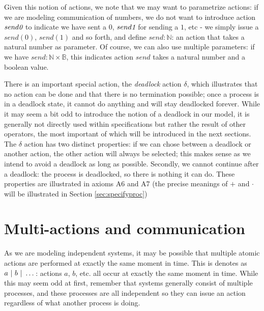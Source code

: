 Given this notion of actions, we note that we may want to parametrize actions: if we are modeling communication of numbers, we do not want to introduce action $send\emph{0}$ to indicate we have sent a $0$, $send\emph{1}$ for sending a $1$, etc - we simply issue a $send(0)$, $send(1)$ and so forth, and define $send : \mathds{N}$: an action that takes a natural number as parameter. Of course, we can also use multiple parameters: if we have $send : \mathds{N} \times \mathds{B}$, this indicates action $send$ takes a natural number and a boolean value.

There is an important special action, the \emph{deadlock} action $\delta$, which illustrates that no action can be done and that there is no termination possible; once a process is in a deadlock state, it cannot do anything and will stay deadlocked forever. While it may seem a bit odd to introduce the notion of a deadlock in our model, it is generally not directly used within specifications but rather the result of other operators, the most important of which will be introduced in the next sections. The $\delta$ action has two distinct properties: if we can chose between a deadlock or another action, the other action will always be selected; this makes sense as we intend to avoid a deadlock as long as possible. Secondly, we cannot continue after a deadlock: the process is deadlocked, so there is nothing it can do. These properties are illustrated in axioms A6 and A7 (the precise meanings of $+$ and $\cdot$ will be illustrated in Section \ref{sec:specifyproc})

\section{Multi-actions and communication}
\label{sec:macomm}

As we are modeling independent systems, it may be possible that multiple atomic actions are performed at exactly the same moment in time. This is denotes as $a ~|~ b ~|~ \dots$: actions $a$, $b$, etc. all occur at exactly the same moment in time. While this may seem odd at first, remember that systems generally consist of multiple processes, and these processes are all independent so they can issue an action regardless of what another process is doing.

